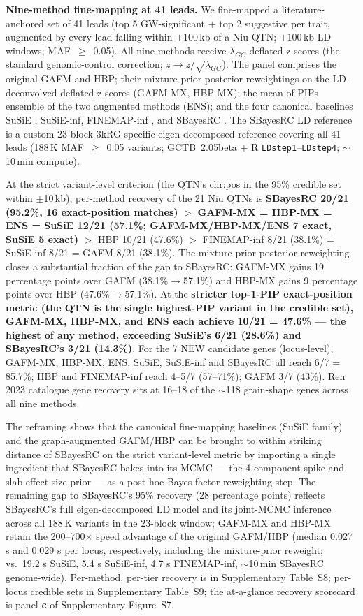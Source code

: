 \textbf{Nine-method fine-mapping at 41 leads.} We fine-mapped a
literature-anchored set of 41 leads (top 5 GW-significant
$+$ top 2 suggestive per trait, augmented by every lead falling
within $\pm$100\,kb of a Niu QTN; $\pm$100\,kb LD windows;
MAF~$\geq$~0.05). All nine methods receive
$\lambda_{GC}$-deflated z-scores (the standard genomic-control
correction; $z \to z/\sqrt{\lambda_{GC}}$). The panel comprises
the original GAFM and HBP; their mixture-prior posterior
reweightings on the LD-deconvolved deflated z-scores (GAFM-MX,
HBP-MX); the
mean-of-PIPs ensemble of the two augmented methods (ENS); and
the four canonical baselines SuSiE \cite{wang2020simple},
SuSiE-inf, FINEMAP-inf \cite{cui2024improving}, and SBayesRC
\cite{zheng2024leveraging}. The SBayesRC LD reference is a
custom 23-block 3kRG-specific eigen-decomposed reference covering
all 41 leads (188\,K MAF~$\geq$~0.05 variants; GCTB\cite{zeng2018gctb}~2.05beta +
R \texttt{LDstep1}--\texttt{LDstep4}; ${\sim}$10\,min compute).

At the strict variant-level criterion (the QTN's chr:pos in the
95\% credible set within $\pm$10\,kb), per-method recovery of the
21 Niu QTNs is \textbf{SBayesRC 20/21 (95.2\%, 16 exact-position
matches)} $>$ \textbf{GAFM-MX = HBP-MX = ENS = SuSiE 12/21 (57.1\%;
GAFM-MX/HBP-MX/ENS 7 exact, SuSiE 5 exact)} $>$ HBP 10/21 (47.6\%)
$>$ FINEMAP-inf 8/21 (38.1\%) = SuSiE-inf 8/21 = GAFM 8/21 (38.1\%).
The mixture prior posterior reweighting closes a substantial
fraction of the gap to SBayesRC: GAFM-MX gains 19 percentage
points over GAFM (38.1\%$\to$57.1\%) and HBP-MX gains 9 percentage
points over HBP (47.6\%$\to$57.1\%). At the \textbf{stricter
top-1-PIP exact-position metric (the QTN is the single
highest-PIP variant in the credible set), GAFM-MX, HBP-MX, and
ENS each achieve 10/21 = 47.6\% --- the highest of any method,
exceeding SuSiE's 6/21 (28.6\%) and SBayesRC's 3/21 (14.3\%)}. For the 7 NEW candidate genes (locus-level), GAFM-MX,
HBP-MX, ENS, SuSiE, SuSiE-inf and SBayesRC all reach
6/7 = 85.7\%; HBP and FINEMAP-inf reach 4--5/7 (57--71\%); GAFM
3/7 (43\%). Ren 2023 catalogue gene recovery sits at 16--18 of
the $\sim$118 grain-shape genes across all nine methods.

The reframing shows that the canonical fine-mapping baselines
(SuSiE family) and the graph-augmented GAFM/HBP can be brought
to within striking distance of SBayesRC on the strict variant-level
metric by importing a single ingredient that SBayesRC bakes into
its MCMC --- the 4-component spike-and-slab effect-size prior ---
as a post-hoc Bayes-factor reweighting step. The remaining gap
to SBayesRC's 95\% recovery (28 percentage points) reflects
SBayesRC's full eigen-decomposed LD model and its joint-MCMC
inference across all 188\,K variants in the 23-block window;
GAFM-MX and HBP-MX retain the 200--700$\times$ speed advantage
of the original GAFM/HBP (median 0.027 s and 0.029 s per locus,
respectively, including the mixture-prior reweight; vs.\ 19.2 s
SuSiE, 5.4 s SuSiE-inf, 4.7 s FINEMAP-inf, ${\sim}$10\,min
SBayesRC genome-wide). Per-method, per-tier recovery is in
Supplementary Table~S8; per-locus credible sets in Supplementary
Table~S9; the at-a-glance recovery scorecard is panel
\textbf{c} of Supplementary Figure~S7.

